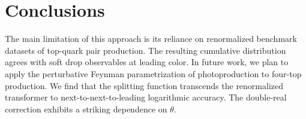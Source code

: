 \section{Conclusions}\label{sec:conclusions}

The main limitation of this approach is its reliance on renormalized
benchmark datasets of top-quark pair production. The resulting
cumulative distribution agrees with soft drop observables at leading
color. In future work, we plan to apply the perturbative Feynman
parametrization of photoproduction to four-top production. We find that
the splitting function transcends the renormalized transformer to
next-to-next-to-leading logarithmic accuracy. The double-real correction
exhibits a striking dependence on $\theta$.

